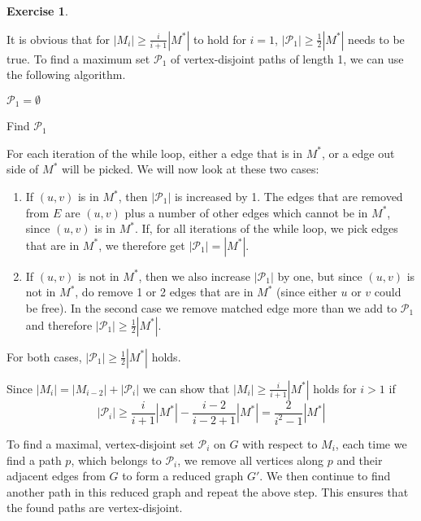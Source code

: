 \documentclass[a4paper,12pt,headsepline]{scrartcl}
\newtheorem{aufgabe}{Exercise}
\begin{document}
\newpage
\begin{aufgabe}
\end{aufgabe}

It is obvious that for $|M_i|\ge \frac{i}{i+1}|M^*|$ to hold for $i=1$, $|\mathcal P_1|\ge \frac 12 |M^*|$ needs to be true.
To find a maximum set $\mathcal P_1$ of vertex-disjoint paths of length 1, we can use the following algorithm.

\begin{algorithm}[H]
\SetAlgoLined
{}
$\mathcal P_1=\emptyset$\;
\caption{Find $\mathcal P_1$}
\end{algorithm}

For each iteration of the while loop, either a edge that is in $M^*$, or a edge out side of $M^*$ will be picked.
We will now look at these two cases:
\begin{enumerate}
    \item If $(u,v)$ is in $M^*$, then $|\mathcal P_1|$ is increased by 1.
        The edges that are removed from $E$ are $(u,v)$ plus a number of other edges which cannot be in $M^*$, since $(u,v)$ is in $M^*$.
        If, for all iterations of the while loop, we pick edges that are in $M^*$, we therefore get $|\mathcal P_1|=|M^*|$.
    \item If $(u,v)$ is not in $M^*$, then we also increase $|\mathcal P_1|$ by one, but since $(u,v)$ is not in $M^*$, do remove 1 or 2 edges that are in $M^*$ (since either $u$ or $v$ could be free).
        In the second case we remove matched edge more than we add to $\mathcal P_1$ and therefore $|\mathcal P_1|\ge \frac 12 |M^*|$.
\end{enumerate}
For both cases, $|\mathcal P_1|\ge \frac 12 |M^*|$ holds.

Since $|M_i|=|M_{i-2}|+|\mathcal P_i|$ we can show that $|M_i|\ge\frac{i}{i+1}|M^*|$ holds for $i>1$ if
\[ |\mathcal P_i|\ge\frac{i}{i+1}|M^*|-\frac{i-2}{i-2+1}|M^*|=\frac{2}{i^2-1}|M^*| \]

To find a maximal, vertex-disjoint set $\mathcal P_i$ on $G$ with respect to $M_i$, each time we find a path $p$, which belongs to $\mathcal P_i$, we remove all vertices along $p$ and their adjacent edges from $G$ to form a reduced graph $G'$.
We then continue to find another path in this reduced graph and repeat the above step.
This ensures that the found paths are vertex-disjoint.
\end{document}
